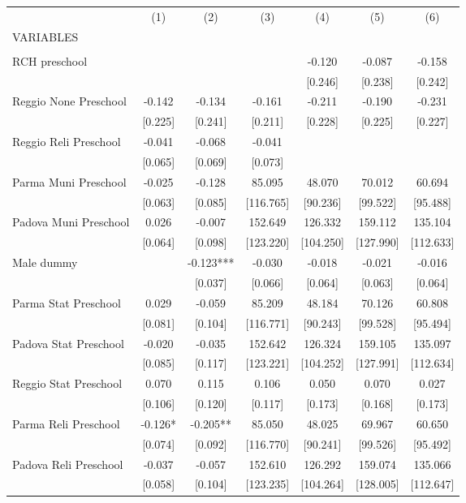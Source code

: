 \begin{tabular}{lcccccc} \hline
 & (1) & (2) & (3) & (4) & (5) & (6) \\
VARIABLES &  &  &  &  &  &  \\ \hline
 &  &  &  &  &  &  \\
RCH preschool &  &  &  & -0.120 & -0.087 & -0.158 \\
 &  &  &  & [0.246] & [0.238] & [0.242] \\
Reggio None Preschool & -0.142 & -0.134 & -0.161 & -0.211 & -0.190 & -0.231 \\
 & [0.225] & [0.241] & [0.211] & [0.228] & [0.225] & [0.227] \\
Reggio Reli Preschool & -0.041 & -0.068 & -0.041 &  &  &  \\
 & [0.065] & [0.069] & [0.073] &  &  &  \\
Parma Muni Preschool & -0.025 & -0.128 & 85.095 & 48.070 & 70.012 & 60.694 \\
 & [0.063] & [0.085] & [116.765] & [90.236] & [99.522] & [95.488] \\
Padova Muni Preschool & 0.026 & -0.007 & 152.649 & 126.332 & 159.112 & 135.104 \\
 & [0.064] & [0.098] & [123.220] & [104.250] & [127.990] & [112.633] \\
Male dummy &  & -0.123*** & -0.030 & -0.018 & -0.021 & -0.016 \\
 &  & [0.037] & [0.066] & [0.064] & [0.063] & [0.064] \\
Parma Stat Preschool & 0.029 & -0.059 & 85.209 & 48.184 & 70.126 & 60.808 \\
 & [0.081] & [0.104] & [116.771] & [90.243] & [99.528] & [95.494] \\
Padova Stat Preschool & -0.020 & -0.035 & 152.642 & 126.324 & 159.105 & 135.097 \\
 & [0.085] & [0.117] & [123.221] & [104.252] & [127.991] & [112.634] \\
Reggio Stat Preschool & 0.070 & 0.115 & 0.106 & 0.050 & 0.070 & 0.027 \\
 & [0.106] & [0.120] & [0.117] & [0.173] & [0.168] & [0.173] \\
Parma Reli Preschool & -0.126* & -0.205** & 85.050 & 48.025 & 69.967 & 60.650 \\
 & [0.074] & [0.092] & [116.770] & [90.241] & [99.526] & [95.492] \\
Padova Reli Preschool & -0.037 & -0.057 & 152.610 & 126.292 & 159.074 & 135.066 \\
 & [0.058] & [0.104] & [123.235] & [104.264] & [128.005] & [112.647] \\

\end{tabular}
